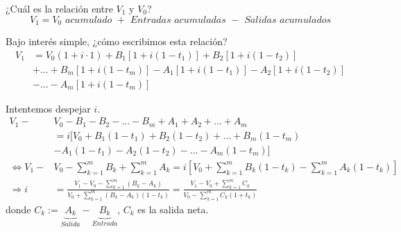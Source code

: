 ¿Cuál es la relación entre $V_1$ y $V_0$?
$$V_1 = V_0 \textit{ acumulado } + \textit{ Entradas acumuladas } - \textit{ Salidas acumulados}$$

Bajo interés simple, ¿cómo escribimos esta relación?
\begin{align*}
    V_1 &= V_0(1+i\cdot 1) + B_1[1+i(1-t_1)] + B_2[1+ i(1-t_2)]\\
    &  + ... + B_m [1+i(1-t_m)] - A_1[1+i(1-t_1)] - A_2[1+i(1-t_2)]  \\
    & - ... - A_m[1+i(1-t_m)]
\end{align*}

Intentemos despejar $i$.
\begin{align*}
    V_1 -& V_0 - B_1 - B_2 - ... - B_m + A_1 + A_2 + ... + A_m\\
    &= i[V_0 + B_1(1-t_1) + B_2(1-t_2) + ... + B_m(1-t_m) \\
    &- A_1(1-t_1) - A_2(1-t_2) - ... - A_m(1-t_m)]\\
    \Leftrightarrow  V_1 -& V_0 - \sum_{k=1}^m B_k + \sum_{k=1}^m A_k = i[V_0 + \sum_{k=1}^m B_k(1-t_k) - \sum_{k=1}^m A_k(1-t_k)]\\
    \Rightarrow i &= \frac{V_1-V_0-\sum_{k=1}^m(B_k-A_k)}{V_0 + \sum_{k=1}^m(B_k-A_k)(1-t_k)} = \frac{V_1-V_0 + \sum_{k=1}^m C_k}{V_0 - \sum_{k=1}^m C_k(1+t_k)}
\end{align*}
donde $C_k := \underbrace{A_k}_{Salida} - \underbrace{B_k}_{Entrada}$, $C_k$ es la salida neta.


